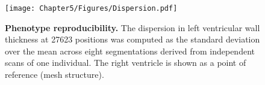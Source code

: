 \begin{figure}[h]
	\centering
	\texttt{[image: Chapter5/Figures/Dispersion.pdf]}
	\caption[\textbf{Phenotype reproducibility. }]{\textbf{Phenotype reproducibility. }The dispersion in left ventricular wall thickness at \num{27623} positions was computed as the standard deviation over the mean across eight segmentations derived from independent scans of one individual. The right ventricle is shown as a point of reference (mesh structure). }
 	\label{fig:reproducibility}
\end{figure}
